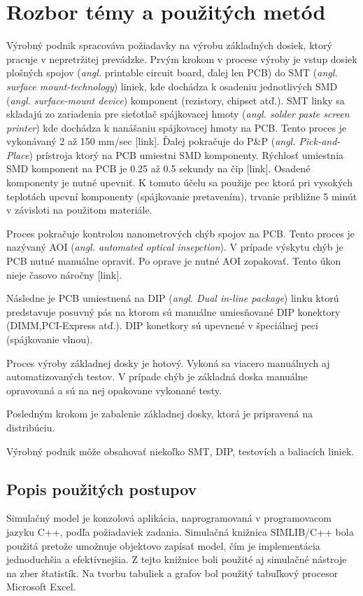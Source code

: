 \documentclass[12pt,a4paper,titlepage,final]{article}
\begin{document}
\section{Rozbor témy a použitých metód}
Výrobný podnik spracováva požiadavky na výrobu základných dosiek, ktorý pracuje
v nepretržitej prevádzke. Prvým krokom v procese výroby je vstup dosiek plošných
spojov (\textit{angl.} printable circuit board, ďalej len PCB) do SMT
(\textit{angl. surface mount-technology}) liniek, kde dochádza k osadeniu jednotlivých
SMD (\textit{angl. surface-mount device}) komponent (rezistory, chipset atď.).
SMT linky sa skladajú zo zariadenia pre sieťotlač spájkovacej 
hmoty (\textit{angl. solder paste screen printer}) kde dochádza k nanášaniu spájkovacej
hmoty na PCB. Tento proces je vykonávaný 2 až 150 mm/sec [link]. Ďalej pokračuje
do P\&P (\textit{angl. Pick-and-Place}) prístroja ktorý na PCB umiestni 
SMD komponenty. Rýchlosť umiestnia SMD komponent na PCB je 0.25 až 0.5 sekundy
na čip [link]. Osadené komponenty je nutné upevniť. K tomuto účelu sa použije
pec ktorá pri vysokých teplotách upevní komponenty (spájkovanie pretavením), 
trvanie približne 5 minút v závisloti na použitom materiále. 

Proces pokračuje kontrolou nanometrových chýb spojov na PCB. Tento proces je 
nazývaný AOI (\textit{angl. automated optical insepction}). V prípade výskytu
chýb je PCB nutné manuálne opraviť. Po oprave je nutné AOI zopakovať. Tento
úkon nieje časovo náročny [link].

Následne je PCB umiestnená na DIP (\textit{angl. Dual in-line package})
linku ktorú predstavuje posuvný pás na ktorom sú manuálne umiesňované 
DIP konektory (DIMM,PCI-Express atď.). DIP konetkory sú upevnené v špeciálnej
peci (spájkovanie vlnou).

Proces výroby základnej dosky je hotový. Vykoná sa viacero manuálnych aj automatizovaných
testov. V prípade chýb je základná doska manuálne opravovaná a sú na nej opakovane vykonané
testy.

Posledným krokom je zabalenie základnej dosky, ktorá je pripravená na distribúciu.

Výrobný podnik môže obsahovať niekoľko SMT, DIP, testovích a baliacích liniek.

\subsection{Popis použitých postupov}
Simulačný model je konzolová aplikácia, naprogramovaná v programovacom jazyku
C++, podľa požiadaviek zadania. Simulačná knižnica SIMLIB/C++ bola použitá pretože
umožnuje objektovo zapísať model, čím je implementácia jednoduchšia a efektívnejšia.
Z tejto knižnice boli použité aj simulačné nástroje na zber štatistík. Na tvorbu
tabuliek a grafov bol použitý tabuľkový procesor Microsoft Excel.
\end{document}
